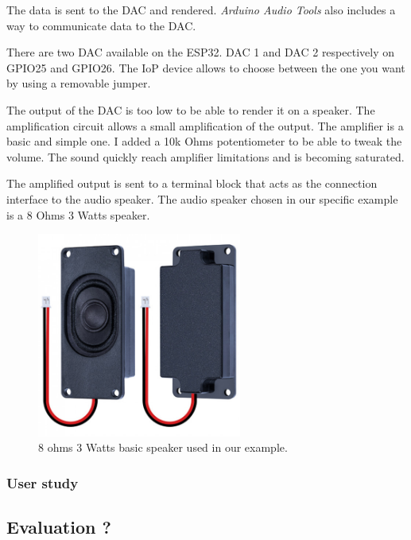 The data is sent to the DAC and rendered. \textit{Arduino Audio Tools} also includes a way to communicate data to the
DAC.


There are two DAC available on the ESP32. DAC 1 and DAC 2 respectively on GPIO25 and GPIO26. The IoP device allows
to choose between the one you want by using a removable jumper.

The output of the DAC is too low to be able to render it on a speaker. The amplification circuit allows a small 
amplification of the output. The amplifier is a basic and simple one. I added a 10k Ohms potentiometer to be able to
tweak the volume. The sound quickly reach amplifier limitations and is becoming saturated. 

The amplified output is sent to a terminal block that acts as the connection interface to the audio speaker.
The audio speaker chosen in our specific example is a 8 Ohms 3 Watts speaker. 

\begin{figure}[h!]
    \centering
    \includegraphics[width=0.6\textwidth]{images/speaker.jpg}
    \caption{8 ohms 3 Watts basic speaker used in our example.} 
    \vspace{0.1cm}
    \label{fig:speaker}
\end{figure}


\newpage
\subsubsection{User study}

\subsection{Evaluation ?}

